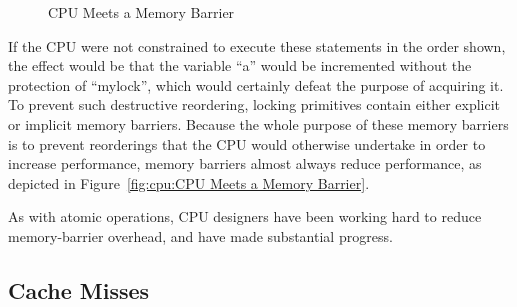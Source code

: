 \begin{figure}[tb]
\centering
{}
\caption{CPU Meets a Memory Barrier}
\end{figure}

If the CPU were not constrained to execute these statements in the
order shown, the effect would be that the variable ``a'' would be
incremented without the protection of ``mylock'', which would certainly
defeat the purpose of acquiring it.
To prevent such destructive reordering, locking primitives contain
either explicit or implicit memory barriers.
Because the whole purpose of these memory barriers is to prevent reorderings
that the CPU would otherwise undertake in order to increase performance,
memory barriers almost always reduce performance, as depicted in
Figure~\ref{fig:cpu:CPU Meets a Memory Barrier}.

As with atomic operations, CPU designers have been working hard to
reduce memory-barrier overhead, and have made substantial progress.

\subsection{Cache Misses}
\label{sec:cpu:Cache Misses}

